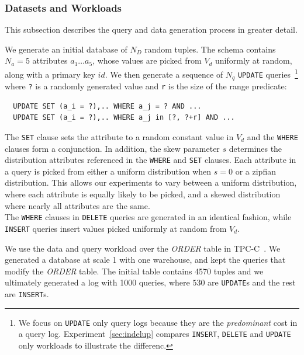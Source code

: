 \subsubsection{Datasets and Workloads}

This subsection describes the query and data generation process in greater detail.

 \label{sec:syntheticgen}
We generate an initial database of $N_D$ random tuples.  
The schema contains $N_a=5$ attributes $a_1\ldots a_5$, whose values are
picked from $V_d$ uniformly at random, along with a primary key $id$.
We then generate a sequence of $N_q$ \texttt{UPDATE} queries~\footnote{\scriptsize We focus on
\texttt{UPDATE} only query logs because they are the {\it predominant} cost 
in a query log.  Experiment~\ref{sec:indelup} compares \texttt{INSERT}, \texttt{DELETE} and \texttt{UPDATE}
only workloads to illustrate the differenc.} where 
\verb|?| is a randomly generated value and \verb|r| is the size of the range predicate: 
{\scriptsize
\begin{verbatim}
  UPDATE SET (a_i = ?),.. WHERE a_j = ? AND ...
  UPDATE SET (a_i = ?),.. WHERE a_j in [?, ?+r] AND ...
\end{verbatim}
}

The \texttt{SET} clause sets the attribute to a random constant value in $V_d$ and 
the \texttt{WHERE} clauses form a conjunction.  
In addition, the skew parameter $s$ determines the distribution attributes referenced in the \texttt{WHERE} and \texttt{SET} clauses.  
Each attribute in a query is picked from either a uniform distribution when $s=0$ or a zipfian~\cite{zipf} distribution.
This allows our experiments to vary between a uniform distribution, where each attribute is
equally likely to be picked, and a skewed distribution where nearly all attributes are the same. \\
The \texttt{WHERE} clauses in \texttt{DELETE} queries are generated in an identical fashion, while
\texttt{INSERT} queries insert values picked uniformly at random from $V_d$.



 We use the data and query workload over the {\it ORDER} table in TPC-C~\cite{difallah2013oltp,}.  
We generated a database at scale 1 with one warehouse, and kept the queries that modify the
{\it ORDER} table. The initial table contains 4570 tuples and we ultimately generated a log with
1000 queries, where $530$ are \texttt{UPDATE}s and the rest are \texttt{INSERT}s.

